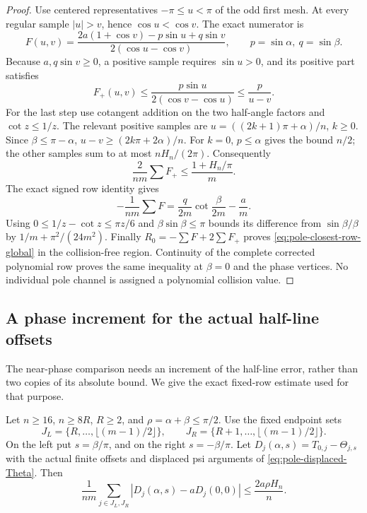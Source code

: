 \begin{proof}
Use centered representatives $-\pi\leq u<\pi$ of the odd first
mesh.  At every regular sample $|u|>v$, hence $\cos u<\cos v$.
The exact numerator is
\[
 F(u,v)=\frac{2a(1+\cos v)-p\sin u+q\sin v}
                         {2(\cos u-\cos v)},
 \qquad p=\sin\alpha,\ q=\sin\beta.
\]
Because $a,q\sin v\geq0$, a positive sample requires
$\sin u>0$, and its positive part satisfies
\[
 F_+(u,v)\leq\frac{p\sin u}{2(\cos v-\cos u)}
       \leq\frac p{u-v}.
\]
For the last step use cotangent addition on the two half-angle
factors and $\cot z\leq1/z$.
The relevant positive samples are
$u=((2k+1)\pi+\alpha)/n$, $k\geq0$.
Since $\beta\leq\pi-\alpha$,
$u-v\geq(2k\pi+2\alpha)/n$.
For $k=0$, $p\leq\alpha$ gives the bound $n/2$; the other
samples sum to at most $nH_n/(2\pi)$.
Consequently
\[
 \frac2{nm}\sum F_+\leq\frac{1+H_n/\pi}{m}.
\]
The exact signed row identity gives
\[
 -\frac1{nm}\sum F
       =\frac{q}{2m}\cot\frac{\beta}{2m}-\frac am.
\]
Using $0\leq1/z-\cot z\leq\pi z/6$ and
$\beta\sin\beta\leq\pi$ bounds its difference from
$\sin\beta/\beta$ by $1/m+\pi^2/(24m^2)$.
Finally $R_0=-\sum F+2\sum F_+$ proves
\eqref{eq:pole-closest-row-global} in the collision-free region.
Continuity of the complete corrected polynomial row proves the same
inequality at $\beta=0$ and the phase vertices.  No individual pole
channel is assigned a polynomial collision value.
\end{proof}

\subsection{A phase increment for the actual half-line offsets}

The near-phase comparison needs an increment of the half-line error,
rather than two copies of its absolute bound.  We give the exact
fixed-row estimate used for that purpose.

\begin{lemma}\label{lem:relative-half-line}
Let $n\geq16$, $n\geq8R$, $R\geq2$, and
$\rho=\alpha+\beta\leq\pi/2$.  Use the fixed endpoint sets
\[
 J_L=\{R,\ldots,\lfloor(m-1)/2\rfloor\},\qquad
 J_R=\{R+1,\ldots,\lfloor(m-1)/2\rfloor\}.
\]
On the left put $s=\beta/\pi$, and on the right $s=-\beta/\pi$.
Let $D_j(\alpha,s)=T_{0,j}-\Theta_{j,s}$ with the actual finite
offsets and displaced psi arguments of
\eqref{eq:pole-displaced-Theta}.  Then
\begin{equation}\label{eq:pole-relative-half-line}
 \frac1{nm}\sum_{j\in J_L,J_R}
       |D_j(\alpha,s)-aD_j(0,0)|
       \leq\frac{2a\rho H_n}{n}.
\end{equation}
\end{lemma}

